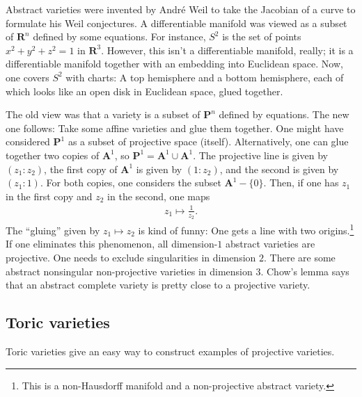 \documentclass [11 pt, oneside] {article}
\begin{document}
Abstract varieties were invented by Andr\'e Weil to take the Jacobian of a curve to formulate his Weil conjectures. A differentiable manifold was viewed as a subset of $\mathbf{R}^n$ defined by some equations. For instance, $S^2$ is the set of points $x^2+y^2+z^2=1$ in $\mathbf{R}^3$. However, this isn't a differentiable manifold, really; it is a differentiable manifold together with an embedding into Euclidean space. Now, one covers $S^2$ with charts: A top hemisphere and a bottom hemisphere, each of which looks like an open disk in Euclidean space, glued together. 

The old view was that a variety is a subset of $\mathbf{P}^n$ defined by equations. The new one follows: Take some affine varieties and glue them together. One might have considered $\mathbf{P}^1$ as a subset of projective space (itself). Alternatively, one can glue together two copies of $\mathbf{A}^1$, so $\mathbf{P}^1=\mathbf{A}^1\cup \mathbf{A}^1$. The projective line is given by $(z_1:z_2)$, the first copy of $\mathbf{A}^1$ is given by $(1:z_2)$, and the second is given by $(z_1:1)$. For both copies, one considers the subset $\mathbf{A}^1-\{0\}$. Then, if one has $z_1$ in the first copy and $z_2$ in the second, one maps
\begin{align*}
	z_1\longmapsto \frac{1}{z_2}.
\end{align*}
The ``gluing'' given by $z_1\longmapsto z_2$ is kind of funny: One gets a line with two origins.\footnote{This is a non-Hausdorff manifold and a non-projective abstract variety.} If one eliminates this phenomenon, all dimension-$1$ abstract varieties are projective. One needs to exclude singularities in dimension $2$. There are some abstract nonsingular non-projective varieties in dimension $3$. Chow's lemma says that an abstract complete variety is pretty close to a projective variety. 

\subsection{Toric varieties}
Toric varieties give an easy way to construct examples of projective varieties.
\end{document}
